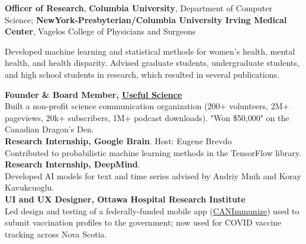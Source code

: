 \documentclass[4pt, letterpaper]{article}
\begin{document}
\textbf{Officer of Research}, \textbf{Columbia University}, Department of Computer Science; \textbf{NewYork-Presbyterian/Columbia University Irving Medical Center}, Vagelos College of Physicians and Surgeons

Developed machine learning and statistical methods for women's health, mental health, and health disparity. Advised graduate students, undergraduate students, and high school students in research, which resulted in several publications.

\textbf{Founder \& Board Member, \href{http://usefulscience.org}{Useful Science}}\\
Built a non-profit science communication organization (200+ volunteers, 2M+ pageviews, 20k+ subscribers, 1M+ podcast downloads). "Won \$50,000" on the Canadian Dragon's Den.\\
\textbf{Research Internship,
{Google Brain}}. Host: {Eugene Brevdo}\\
Contributed to probabilistic machine learning methods in the TensorFlow library.\\
\textbf{Research Internship,
{DeepMind}}. \\
Developed AI models for text and time series advised by Andriy Mnih and Koray Kavukcuoglu. \\%
\textbf{UI and UX Designer, Ottawa Hospital Research Institute}\\
Led design and testing of a federally-funded mobile app (\href{https://www.canimmunize.ca}{CANImmunize}) used to submit vaccination profiles to the government; now used for COVID vaccine tracking across Nova Scotia. %
\end{document}
